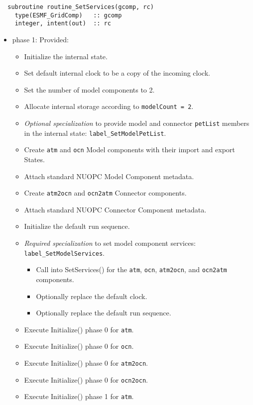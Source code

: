 \begin{verbatim}  subroutine routine_SetServices(gcomp, rc)
    type(ESMF_GridComp)   :: gcomp
    integer, intent(out)  :: rc
\end{verbatim}

\begin{itemize}
\item phase 1: {\sc Provided:}
  \begin{itemize}
  \item Initialize the internal state.
  \item Set default internal clock to be a copy of the incoming clock.
  \item Set the number of model components to 2.
  \item Allocate internal storage according to {\tt modelCount = 2}.
  \item {\it Optional specialization} to provide model and connector {\tt petList} members in the internal state: {\tt label\_SetModelPetList}.
  \item Create {\tt atm} and {\tt ocn} Model components with their import and export States.
  \item Attach standard NUOPC Model Component metadata.
  \item Create {\tt atm2ocn} and {\tt ocn2atm} Connector components.
  \item Attach standard NUOPC Connector Component metadata.
  \item Initialize the default run sequence.
  \item {\it Required specialization} to set model component services: {\tt label\_SetModelServices}. 
  \begin{itemize}
    \item Call into SetServices() for the {\tt atm}, {\tt ocn}, {\tt atm2ocn}, and {\tt ocn2atm} components.
    \item Optionally replace the default clock. 
    \item Optionally replace the default run sequence.
  \end{itemize}
  \item Execute Initialize() phase 0 for {\tt atm}.
  \item Execute Initialize() phase 0 for {\tt ocn}.
  \item Execute Initialize() phase 0 for {\tt atm2ocn}.
  \item Execute Initialize() phase 0 for {\tt ocn2ocn}.
  \item Execute Initialize() phase 1 for {\tt atm}.

\end{itemize}
\end{itemize}
